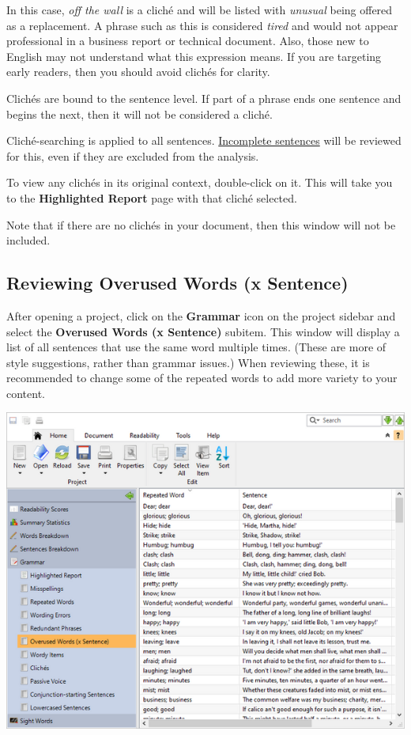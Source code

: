 \documentclass[
]{book}
\theoremstyle{definition}
\theoremstyle{definition}
\theoremstyle{definition}
\theoremstyle{definition}
\theoremstyle{remark}
\begin{document}
In this case, \emph{off the wall} is a cliché and will be listed with \emph{unusual} being offered as a replacement. A phrase such as this is considered \emph{tired} and would not appear professional in a business report or technical document. Also, those new to English may not understand what this expression means. If you are targeting early readers, then you should avoid clichés for clarity.

Clichés are bound to the sentence level. If part of a phrase ends one sentence and begins the next, then it will not be considered a cliché.

Cliché-searching is applied to all sentences. \protect\hyperlink{how-text-is-excluded}{Incomplete sentences} will be reviewed for this, even if they are excluded from the analysis.

To view any clichés in its original context, double-click on it. This will take you to the \textbf{Highlighted Report} page with that cliché selected.

Note that if there are no clichés in your document, then this window will not be included.

\hypertarget{reviewing-overused-by-sentence}{%
\subsection*{Reviewing Overused Words (x Sentence)}\label{reviewing-overused-by-sentence}}

After opening a project, click on the \textbf{Grammar} icon on the project sidebar and select the \textbf{Overused Words (x Sentence)} subitem. This window will display a list of all sentences that use the same word multiple times. (These are more of style suggestions, rather than grammar issues.) When reviewing these, it is recommended to change some of the repeated words to add more variety to your content.

\includegraphics{Images/overusedwordsbysentence.png}
\end{document}
